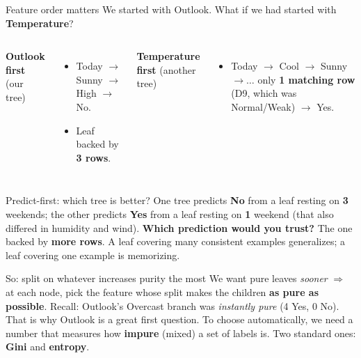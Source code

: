 \documentclass[aspectratio=169]{beamer}
\begin{document}
\begin{frame}{Feature order matters}
  We started with Outlook. What if we had started with \textbf{Temperature}?
  \vfill
  \begin{columns}[T]
    \textbf{Outlook first} (our tree)
    \begin{itemize}\small
      \item Today $\to$ Sunny $\to$ High $\to$ \textcolor{armred}{No}.
      \item Leaf backed by \textbf{3 rows}.
    \end{itemize}
    \textbf{Temperature first} (another tree)
    \begin{itemize}\small
      \item Today $\to$ Cool $\to$ Sunny $\to \dots$ only \textbf{1 matching row}
        (D9, which was Normal/Weak) $\to$ \textcolor{paramgreen}{Yes}.
    \end{itemize}
  \end{columns}
  \vfill
\end{frame}

\begin{frame}{Predict-first: which tree is better?}
  One tree predicts \textbf{No} from a leaf resting on \textbf{3} weekends; the other
  predicts \textbf{Yes} from a leaf resting on \textbf{1} weekend (that also differed in
  humidity and wind).
  \vfill
  \textbf{Which prediction would you trust?}
  \pause
  \vfill
  The one backed by \textbf{more rows}. A leaf covering many consistent examples
  generalizes; a leaf covering one example is memorizing.
  \vfill
\end{frame}

\begin{frame}{So: split on whatever increases purity the most}
  We want pure leaves \emph{sooner} $\Rightarrow$ at each node, pick the feature whose
  split makes the children \textbf{as pure as possible}.
  \vfill
  Recall: Outlook's Overcast branch was \emph{instantly pure} (4 Yes, 0 No). That is
  why Outlook is a great first question.
  \vfill
  To choose automatically, we need a number that measures how \textbf{impure} (mixed) a
  set of labels is. Two standard ones: \textbf{Gini} and \textbf{entropy}.
\end{frame}
\end{document}
